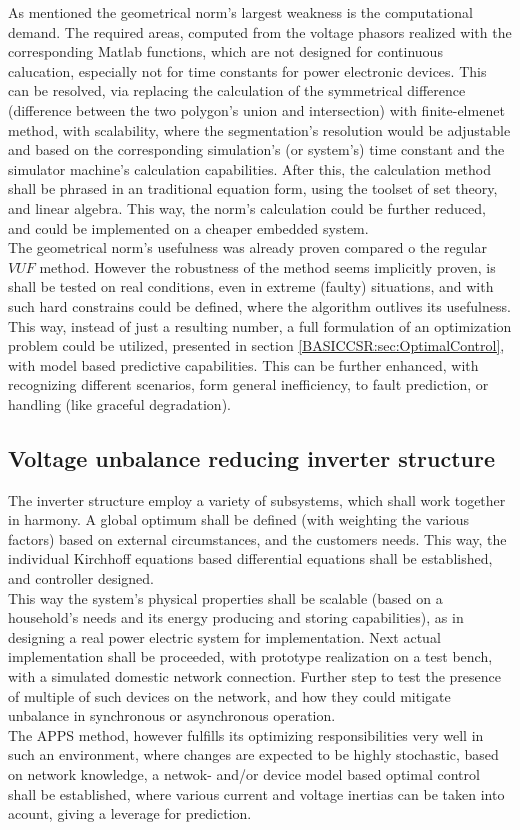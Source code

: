 		As mentioned the geometrical norm's largest weakness is the computational demand. The required areas, computed from the voltage phasors realized with the corresponding Matlab functions, which are not designed for continuous calucation, especially not for time constants for power electronic devices. This can be resolved, via replacing the calculation of the symmetrical difference (difference between the two polygon's union and intersection) with finite-elmenet method, with scalability, where the segmentation's resolution would be adjustable and based on the corresponding simulation's (or system's) time constant and the simulator machine's calculation capabilities. After this, the calculation method shall be phrased in an traditional equation form, using the toolset of set theory, and linear algebra. This way, the norm's calculation could be further reduced, and could be implemented on a cheaper embedded system.\\
		The geometrical norm's usefulness was already proven compared o the regular $VUF$ method. However the robustness of the method seems implicitly proven, is shall be tested on real conditions, even in extreme (faulty) situations, and with such hard constrains could be defined, where the algorithm outlives its usefulness. This way, instead of just a resulting number, a full formulation of an optimization problem could be utilized, presented in section \ref{BASICCSR:sec:OptimalControl}, with model based predictive capabilities. This can be further enhanced, with recognizing different scenarios, form general inefficiency, to fault prediction, or handling (like graceful degradation).
		
		\subsection{Voltage unbalance reducing inverter structure}
		
		The inverter structure employ a variety of subsystems, which shall work together in harmony. A global optimum shall be defined (with weighting the various factors) based on external circumstances, and the customers needs. This way, the individual Kirchhoff equations based differential equations shall be established, and controller designed.\\
		This way the system's physical properties shall be scalable (based on a household's needs and its energy producing and storing capabilities), as in designing a real power electric system for implementation. Next actual implementation shall be proceeded, with prototype realization on a test bench, with a simulated domestic network connection. Further step to test the presence of multiple of such devices on the network, and how they could mitigate unbalance in synchronous or asynchronous operation. \\
		The APPS method, however fulfills its optimizing responsibilities very well in such an environment, where changes are expected to be highly stochastic, based on network knowledge, a netwok- and/or device model based optimal control shall be established, where various current and voltage inertias can be taken into acount, giving a leverage for prediction.
		
